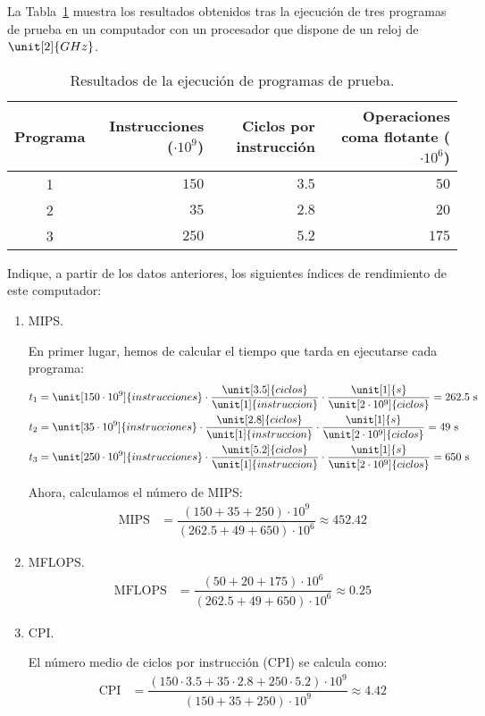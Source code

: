 \begin{ejercicio}\label{ej:4.8}
La Tabla~\ref{tab:ej:4.8} muestra los resultados obtenidos tras la ejecución de tres programas de prueba en un computador con un procesador que dispone de un reloj de $\unit[2]{GHz}$.
\begin{table}[h]
\centering
\begin{tabular}{@{}crrr@{}}
\toprule
Programa & Instrucciones ($\cdot 10^9$) & Ciclos por instrucción & Operaciones coma flotante ($\cdot 10^6$) \\ \midrule
1 & $150$ & $3.5$ & $50$ \\
2 & $35$ & $2.8$ & $20$ \\
3 & $250$ & $5.2$ & $175$ \\ \bottomrule
\end{tabular}
\caption{Resultados de la ejecución de programas de prueba.}
\label{tab:ej:4.8}
\end{table}
Indique, a partir de los datos anteriores, los siguientes índices de rendimiento de este computador:
\begin{enumerate}
    \item MIPS.
    
    En primer lugar, hemos de calcular el tiempo que tarda en ejecutarse cada programa:
    \begin{align*}
        t_1 &= \unit[150\cdot 10^9]{instrucciones}\cdot \dfrac{\unit[3.5]{ciclos}}{\unit[1]{instruccion}}\cdot \dfrac{\unit[1]{s}}{\unit[2\cdot 10^9]{ciclos}} = 262.5 \text{ s}\\
        t_2 &= \unit[35\cdot 10^9]{instrucciones}\cdot \dfrac{\unit[2.8]{ciclos}}{\unit[1]{instruccion}}\cdot \dfrac{\unit[1]{s}}{\unit[2\cdot 10^9]{ciclos}} = 49 \text{ s}\\
        t_3 &= \unit[250\cdot 10^9]{instrucciones}\cdot \dfrac{\unit[5.2]{ciclos}}{\unit[1]{instruccion}}\cdot \dfrac{\unit[1]{s}}{\unit[2\cdot 10^9]{ciclos}} = 650 \text{ s}
    \end{align*}

    Ahora, calculamos el número de MIPS:
    \begin{align*}
        \text{MIPS} &= \dfrac{(150 + 35 + 250)\cdot 10^9}{(262.5 + 49 + 650)\cdot 10^6} \approx 452.42
    \end{align*}
    \item MFLOPS.
    \begin{align*}
        \text{MFLOPS} &= \dfrac{(50 + 20 + 175)\cdot 10^6}{(262.5 + 49 + 650)\cdot 10^6} \approx 0.25
    \end{align*}
    \item CPI.
    
    El número medio de ciclos por instrucción (CPI) se calcula como:
    \begin{align*}
        \text{CPI} &= \dfrac{(150\cdot 3.5 + 35\cdot 2.8 + 250\cdot 5.2)\cdot 10^9}{(150 + 35 + 250)\cdot 10^9} \approx 4.42
    \end{align*}
\end{enumerate}
\end{ejercicio}
\begin{comment}Sol:
Los índices obtenidos son: 452,42 MIPS, 0,25 MFLOPS y 4,4 CPI.
\end{comment}

